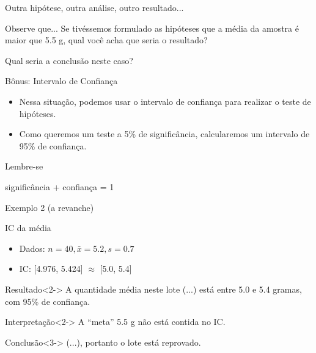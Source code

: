 \documentclass{beamer}
\begin{document}
\begin{frame}{\scriptsize Outra hipótese, outra análise, outro resultado...}
  \begin{block}{Observe que...}
    \footnotesize
    Se tivéssemos formulado as hipóteses que a média da amostra é maior que 5.5 g, qual você acha que seria o resultado?

    \bigskip
    Qual seria a conclusão neste caso?
  \end{block}
\end{frame}

\begin{frame}{\scriptsize Bônus: Intervalo de Confiança}
  \begin{itemize}
    \scriptsize
  \item Nessa situação, podemos usar o intervalo de confiança para
    realizar o teste de hipóteses.
    \medskip
  \item Como queremos um teste a 5\% de significância, calcularemos um
    intervalo de 95\% de confiança.
  \end{itemize}
  \bigskip
  \begin{block}{Lembre-se}
    \footnotesize
    \begin{center}
      significância + confiança = 1
    \end{center}
  \end{block}
\end{frame}

\begin{frame}{\scriptsize Exemplo 2 (a revanche)}
  \begin{exampleblock}{IC da média}
    \footnotesize
    \begin{itemize}
      \scriptsize
    \item Dados: $n=40, \bar{x} = 5.2, s = 0.7$
    \item IC: [4.976, 5.424] $\approx$ [5.0, 5.4]
    \end{itemize}
  \end{exampleblock}
  \begin{exampleblock}{Resultado}<2->
    \footnotesize
    A quantidade média neste lote (...)
    está entre 5.0 e 5.4 gramas, com 95\% de confiança.
  \end{exampleblock}
  \begin{exampleblock}{Interpretação}<2->
    \footnotesize
    A ``meta'' 5.5 g não está contida no IC.
  \end{exampleblock}
  \begin{exampleblock}{Conclusão}<3->
    \footnotesize
    (...), portanto o lote está reprovado.
  \end{exampleblock}
\end{frame}
\end{document}
